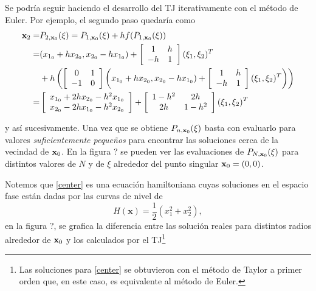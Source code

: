 Se podría seguir haciendo el desarrollo del TJ iterativamente con el método de Euler. Por ejemplo, el segundo paso quedaría como 
\begin{align*}
\mathbf{x}_2 =& P_{2,\mathbf{x}_0}(\xi) = P_{1,\mathbf{x}_0}(\xi) + h f(P_{1,\mathbf{x}_0}(\xi)) \\
=& (x_{1_0} + h x_{2_0}, x_{2_0} - h x_{1_0}) + \left[ \begin{array}{cc}
 1 & h  \\
-h & 1  \\
\end{array} \right] (\xi_1,\xi_2)^T \\ 
&+ h \left( \left[ \begin{array}{cc}
 0 & 1  \\
-1 & 0  \\
\end{array} \right] \left( x_{1_0} + h x_{2_0}, x_{2_0} - h x_{1_0}) + \left[ \begin{array}{cc}
 1 & h  \\
-h & 1  \\
\end{array} \right] (\xi_1,\xi_2)^T \right) \right) \\
=& \left[ \begin{array}{c}
x_{1_0} + 2h x_{2_0} - h^2x_{1_0}  \\
x_{2_0} - 2h x_{1_0} - h^2x_{2_0}  \\
\end{array} \right] + \left[ \begin{array}{cc}
 1-h^2 & 2h  \\
2h & 1-h^2  \\
\end{array} \right] (\xi_1,\xi_2)^T
\end{align*}
 
y así sucesivamente. Una vez que se obtiene $P_{n,\mathbf{x}_0}(\xi)$ basta con evaluarlo para valores \textit{suficientemente pequeños} para encontrar las soluciones cerca de la vecindad de $\mathbf{x}_0$. En la figura ? se pueden ver las evaluaciones de $P_{N,\mathbf{x}_0}(\xi)$ para distintos valores de $N$ y de $\xi$ alrededor del punto singular $\mathbf{x}_0 = (0,0)$.

Notemos que \ref{center} es una ecuación hamiltoniana cuyas soluciones en el espacio fase están dadas por las curvas de nivel de
\begin{equation*}
H(\mathbf{x}) = \frac{1}{2} \left( x_1^2 + x_2^2 \right),
\end{equation*} 
en la figura ?, se grafica la diferencia entre las solución reales para distintos radios alrededor de $\mathbf{x}_0$ y los calculados por el TJ\footnote{Las soluciones para \ref{center} se obtuvieron con el método de Taylor a primer orden que, en este caso, es equivalente al método de Euler.}

